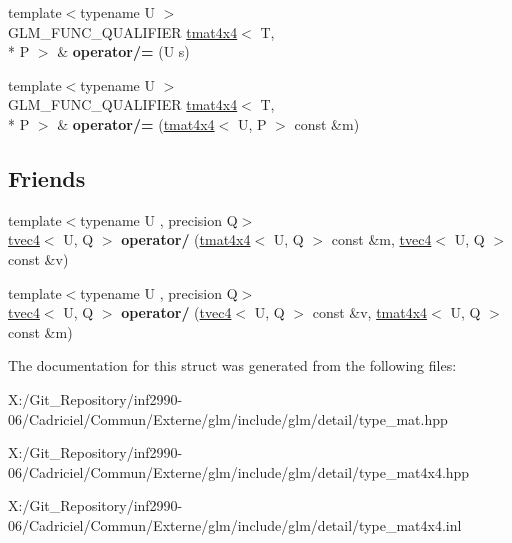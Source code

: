 \begin{DoxyCompactItemize}
\item 
\hypertarget{structglm_1_1detail_1_1tmat4x4_a35520d796cd223a312d44020b3031f75}{{\footnotesize template$<$typename U $>$ }\\G\-L\-M\-\_\-\-F\-U\-N\-C\-\_\-\-Q\-U\-A\-L\-I\-F\-I\-E\-R \hyperlink{structglm_1_1detail_1_1tmat4x4}{tmat4x4}$<$ T, \\*
P $>$ \& {\bfseries operator/=} (U s)}\label{structglm_1_1detail_1_1tmat4x4_a35520d796cd223a312d44020b3031f75}

\item 
\hypertarget{structglm_1_1detail_1_1tmat4x4_ac5a16fad4c2fb2aac28c584fbcc7ee74}{{\footnotesize template$<$typename U $>$ }\\G\-L\-M\-\_\-\-F\-U\-N\-C\-\_\-\-Q\-U\-A\-L\-I\-F\-I\-E\-R \hyperlink{structglm_1_1detail_1_1tmat4x4}{tmat4x4}$<$ T, \\*
P $>$ \& {\bfseries operator/=} (\hyperlink{structglm_1_1detail_1_1tmat4x4}{tmat4x4}$<$ U, P $>$ const \&m)}\label{structglm_1_1detail_1_1tmat4x4_ac5a16fad4c2fb2aac28c584fbcc7ee74}

\end{DoxyCompactItemize}
\subsection*{Friends}
\begin{DoxyCompactItemize}
\item 
\hypertarget{structglm_1_1detail_1_1tmat4x4_a4d1472f6e50839c280a3a7f32396b3f1}{{\footnotesize template$<$typename U , precision Q$>$ }\\\hyperlink{structglm_1_1detail_1_1tvec4}{tvec4}$<$ U, Q $>$ {\bfseries operator/} (\hyperlink{structglm_1_1detail_1_1tmat4x4}{tmat4x4}$<$ U, Q $>$ const \&m, \hyperlink{structglm_1_1detail_1_1tvec4}{tvec4}$<$ U, Q $>$ const \&v)}\label{structglm_1_1detail_1_1tmat4x4_a4d1472f6e50839c280a3a7f32396b3f1}

\item 
\hypertarget{structglm_1_1detail_1_1tmat4x4_a786a67d54520cab5d9ecd91530012ac2}{{\footnotesize template$<$typename U , precision Q$>$ }\\\hyperlink{structglm_1_1detail_1_1tvec4}{tvec4}$<$ U, Q $>$ {\bfseries operator/} (\hyperlink{structglm_1_1detail_1_1tvec4}{tvec4}$<$ U, Q $>$ const \&v, \hyperlink{structglm_1_1detail_1_1tmat4x4}{tmat4x4}$<$ U, Q $>$ const \&m)}\label{structglm_1_1detail_1_1tmat4x4_a786a67d54520cab5d9ecd91530012ac2}

\end{DoxyCompactItemize}


The documentation for this struct was generated from the following files\-:\begin{DoxyCompactItemize}
\item 
X\-:/\-Git\-\_\-\-Repository/inf2990-\/06/\-Cadriciel/\-Commun/\-Externe/glm/include/glm/detail/type\-\_\-mat.\-hpp\item 
X\-:/\-Git\-\_\-\-Repository/inf2990-\/06/\-Cadriciel/\-Commun/\-Externe/glm/include/glm/detail/type\-\_\-mat4x4.\-hpp\item 
X\-:/\-Git\-\_\-\-Repository/inf2990-\/06/\-Cadriciel/\-Commun/\-Externe/glm/include/glm/detail/type\-\_\-mat4x4.\-inl\end{DoxyCompactItemize}
